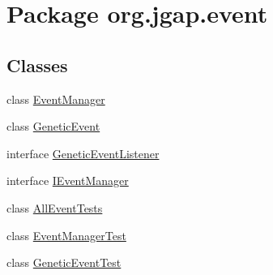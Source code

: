 \hypertarget{namespaceorg_1_1jgap_1_1event}{\section{Package org.\-jgap.\-event}
\label{namespaceorg_1_1jgap_1_1event}
}
\subsection*{Classes}
\begin{DoxyCompactItemize}
\item 
class \hyperlink{classorg_1_1jgap_1_1event_1_1_event_manager}{Event\-Manager}
\item 
class \hyperlink{classorg_1_1jgap_1_1event_1_1_genetic_event}{Genetic\-Event}
\item 
interface \hyperlink{interfaceorg_1_1jgap_1_1event_1_1_genetic_event_listener}{Genetic\-Event\-Listener}
\item 
interface \hyperlink{interfaceorg_1_1jgap_1_1event_1_1_i_event_manager}{I\-Event\-Manager}
\item 
class \hyperlink{classorg_1_1jgap_1_1event_1_1_all_event_tests}{All\-Event\-Tests}
\item 
class \hyperlink{classorg_1_1jgap_1_1event_1_1_event_manager_test}{Event\-Manager\-Test}
\item 
class \hyperlink{classorg_1_1jgap_1_1event_1_1_genetic_event_test}{Genetic\-Event\-Test}
\end{DoxyCompactItemize}
